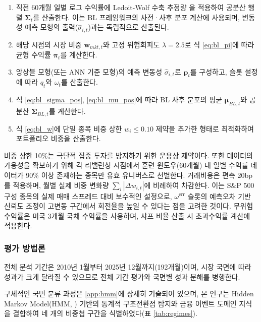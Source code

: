 \documentclass{article}
\begin{document}
\begin{enumerate}
  \item 직전 60개월 일별 로그 수익률에 Ledoit-Wolf 수축 추정량 \citep{ledoitwolf2004}을 적용하여 공분산 행렬 $\boldsymbol{\Sigma}_t$를 산출한다. 이는 BL 프레임워크의 사전·사후 분포 계산에 사용되며, 변동성 예측 모형의 출력($\hat{\sigma}_{i,t}$)과는 독립적으로 산출된다.
  \item 해당 시점의 시장 비중 $\mathbf{w}_{mkt,t}$와 고정 위험회피도 $\lambda = 2.5$로 식 \eqref{eq:bl_pi}에 따라 균형 수익률 $\boldsymbol{\pi}_t$를 계산한다.
  \item 앙상블 모형(또는 ANN 기준 모형)의 예측 변동성 $\hat{\sigma}_{i,t}$로 $\mathbf{p}_t$를 구성하고, 슬롯 설정에 따라 $q_t$와 $\omega_t$를 산출한다.
  \item 식 \eqref{eq:bl_sigma_pos}, \eqref{eq:bl_mu_pos}에 따라 BL 사후 분포의 평균 $\boldsymbol{\mu}_{BL,t}$와 공분산 $\boldsymbol{\Sigma}_{BL,t}$를 계산한다.
  \item 식 \eqref{eq:bl_w}에 단일 종목 비중 상한 $w_i \leq 0.10$ 제약을 추가한 형태로 최적화하여 포트폴리오 비중을 산출한다.
\end{enumerate}

비중 상한 10\%는 극단적 집중 투자를 방지하기 위한 운용상 제약이다. 또한 데이터의 가용성을 확보하기 위해 각 리밸런싱 시점에서 훈련 윈도우(60개월) 내 일별 수익률 데이터가 90\% 이상 존재하는 종목만 유효 유니버스로 선별한다. 거래비용은 편측 20bp를 적용하며, 월별 실제 비중 변화량 $\sum_i |\Delta w_{i,t}|$에 비례하여 차감한다. 이는 S\&P 500 구성 종목의 실제 매매 스프레드 대비 보수적인 설정으로, $\omega^{\mathrm{err}}$ 슬롯의 예측오차 기반 신뢰도 조정이 고변동 구간에서 회전율을 높일 수 있다는 점을 고려한 것이다. 무위험 수익률은 미국 3개월 국채 수익률을 사용하며, 샤프 비율 산출 시 초과수익률 계산에 적용한다.

\subsubsection{평가 방법론}
\label{subsubsec:bl_eval}

전체 분석 기간은 2010년 1월부터 2025년 12월까지(192개월)이며, 시장 국면에 따라 성과가 크게 달라질 수 있으므로 전체 기간 평가와 국면별 성과 분해를 병행한다.

구체적인 국면 분류 과정은 \ref{app:hmm}에 상세히 기술되어 있으며, 본 연구는 Hidden Markov Model(HMM, \citealp{hamilton1989new}) 기반의 통계적 구조전환점 탐지와 금융 이벤트 도메인 지식을 결합하여 네 개의 비중첩 구간을 식별하였다(표 \ref{tab:regimes}).
\end{document}
